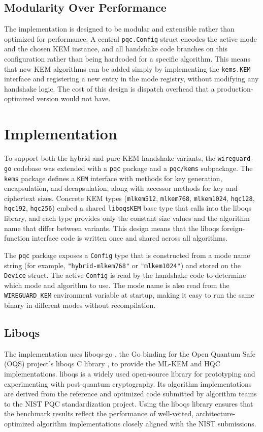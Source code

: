 \subsection{Modularity Over Performance} 
The implementation is designed to be modular and extensible rather than optimized for performance. A central \texttt{pqc.Config} struct encodes the active mode and the chosen KEM instance, and all handshake code branches on this configuration rather than being hardcoded for a specific algorithm. This means that new KEM algorithms can be added simply by implementing the \texttt{kems.KEM} interface and registering a new entry in the mode registry, without modifying any handshake logic. The cost of this design is dispatch overhead that a production-optimized version would not have.


\section{Implementation}
To support both the hybrid and pure-KEM handshake variants, the \texttt{wireguard-go} codebase was extended with a \texttt{pqc} package and a \texttt{pqc/kems} subpackage. The \texttt{kems} package defines a \texttt{KEM} interface with methods for key generation, encapsulation, and decapsulation, along with accessor methods for key and ciphertext sizes. Concrete KEM types (\texttt{mlkem512}, \texttt{mlkem768}, \texttt{mlkem1024}, \texttt{hqc128}, \texttt{hqc192}, \texttt{hqc256}) embed a shared \texttt{liboqsKEM} base type that calls into the liboqs library, and each type provides only the constant size values and the algorithm name that differ between variants. This design means that the liboqs foreign-function interface code is written once and shared across all algorithms.

The \texttt{pqc} package exposes a \texttt{Config} type that is constructed from a mode name string (for example, \texttt{"hybrid-mlkem768"} or \texttt{"mlkem1024"}) and stored on the \texttt{Device} struct. The active \texttt{Config} is read by the handshake code to determine which mode and algorithm to use. The mode name is also read from the \texttt{WIREGUARD\_KEM} environment variable at startup, making it easy to run the same binary in different modes without recompilation.

\subsection{Liboqs} 
The implementation uses liboqs-go \cite{liboqsgo}, the Go binding for the Open Quantum Safe (OQS) project's liboqs C library \cite{liboqs}, to provide the ML-KEM and HQC implementations. liboqs is a widely used open-source library for prototyping and experimenting with post-quantum cryptography. Its algorithm implementations are derived from the reference and optimized code submitted by algorithm teams to the NIST PQC standardization project. Using the liboqs library ensures that the benchmark results reflect the performance of well-vetted, architecture-optimized algorithm implementations closely aligned with the NIST submissions. 

